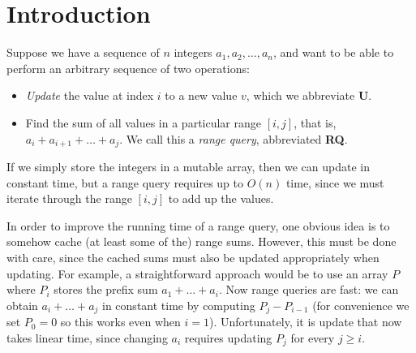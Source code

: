 \documentclass[acmsmall,review]{acmart}\settopmatter{printfolios=true,printccs=false,printacmref=false}
\newcommand{\Up}{\textbf{U}\xspace}
\newcommand{\RQ}{\textbf{RQ}\xspace}
\begin{document}




\maketitle


\section{Introduction}

Suppose we have a sequence of $n$ integers $a_1, a_2, \dots, a_n$, and
want to be able to perform an arbitrary sequence of two operations:

\begin{itemize}
\item \emph{Update} the value at index $i$ to a new value $v$, which
  we abbreviate \Up.
\item Find the sum of all values in a particular range $[i, j]$,
  that is, $a_i + a_{i+1} + \dots + a_j$.  We call this a \emph{range
    query}, abbreviated \RQ.
\end{itemize}

If we simply store the integers in a mutable array, then we can update
in constant time, but a range query requires up to $O(n)$ time, since
we must iterate through the range $[i, j]$ to add up the values.

In order to improve the running time of a range query, one obvious
idea is to somehow cache (at least some of the) range sums.  However,
this must be done with care, since the cached sums must also be
updated appropriately when updating.  For example, a straightforward
approach would be to use an array $P$ where $P_i$ stores the prefix
sum $a_1 + \dots + a_i$.  Now range queries are fast: we can obtain
$a_i + \dots + a_j$ in constant time by computing $P_j - P_{i-1}$ (for
convenience we set $P_0 = 0$ so this works even when $i=1$).
Unfortunately, it is update that now takes linear time, since changing
$a_i$ requires updating $P_j$ for every $j \geq i$.
\end{document}
